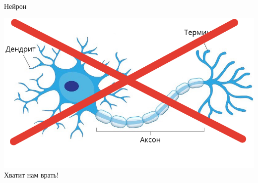 \documentclass[notes,12pt, aspectratio=169]{beamer}
\begin{document}
\begin{frame}{Нейрон}
\begin{center}
		\includegraphics[width=0.55\paperwidth]{brain_neuron.png} \\
		\Large \alert{Хватит нам врать!}
\end{center}
\end{frame}
\end{document}
